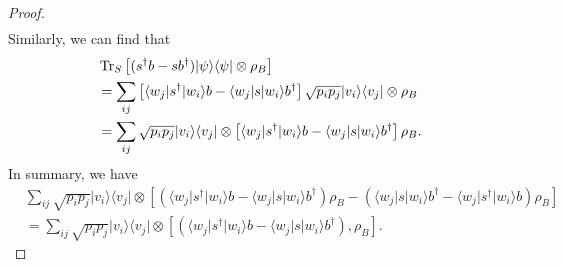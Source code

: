 \documentclass[../../note.tex]{subfiles}
\begin{document}
\begin{proof}
\begin{align}
    \end{align}
    Similarly, we can find that 
    \begin{align}
        &\operatorname{Tr}_S\left[(s^\dagger b - s b^\dagger)\vert \psi \rangle \langle \psi \vert \otimes \rho_B\right]\\ 
        &= \sum_{ij} \left[\langle w_j \vert s^\dagger \vert w_i \rangle b - \langle w_j \vert s \vert w_i \rangle b^\dagger \right] \sqrt{p_i p_j} \vert v_i \rangle \langle v_j \vert \otimes \rho_B \\
        &= \sum_{ij} \sqrt{p_i p_j} \vert v_i \rangle \langle v_j \vert \otimes \left[\langle w_j \vert s^\dagger \vert w_i \rangle b - \langle w_j \vert s \vert w_i \rangle b^\dagger\right]\rho_B.
    \end{align}
    In summary, we have
    \begin{align}
        &\sum_{ij} \sqrt{p_i p_j} \vert v_i \rangle \langle v_j \vert \otimes \left[\left(\langle w_j \vert s^\dagger \vert w_i \rangle b - \langle w_j \vert s \vert w_i \rangle b^\dagger\right) \rho_B -  \left(\langle w_j \vert s \vert w_i \rangle b^\dagger - \langle w_j \vert s^\dagger \vert w_i \rangle b \right) \rho_B \right] \\
        &= \sum_{ij} \sqrt{p_i p_j} \vert v_i \rangle \langle v_j \vert \otimes \left[\left(\langle w_j \vert s^\dagger \vert w_i \rangle b - \langle w_j \vert s \vert w_i \rangle b^\dagger\right), \rho_B \right].
    \end{align}
\end{proof}
\end{document}
